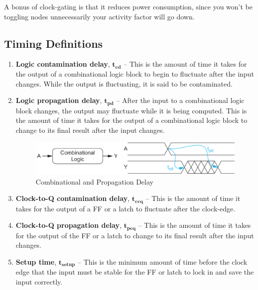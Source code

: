 \documentclass{article}
\begin{document}
A bonus of clock-gating is that it reduces power consumption, since you won't be toggling nodes unnecessarily your activity factor will go down.

\subsection{Timing Definitions}

\begin{enumerate}

\item \textbf{Logic contamination delay}, $\mathbf{t_{cd}}$ -- This is the amount of time it takes for the output of a combinational logic block to begin to fluctuate after the input changes. While the output is fluctuating, it is said to be contaminated.

\item \textbf{Logic propagation delay}, $\mathbf{t_{pd}}$ -- After the input to a combinational logic block changes, the output may fluctuate while it is being computed. This is the amount of time it takes for the output of a combinational logic block to change to its final result after the input changes. 

\begin{figure}[ht!]
\centering
\includegraphics[width=110mm]{Prop.png}
\caption{Combinational and Propagation Delay}
\end{figure}

\item \textbf{Clock-to-Q contamination delay}, $\mathbf{t_{ccq}}$ -- This is the amount of time it takes for the output of a FF or a latch to fluctuate after the clock-edge. 

\item \textbf{Clock-to-Q propagation delay}, $\mathbf{t_{pcq}}$ -- This is the amount of time it takes for the output of the FF or a latch to change to its final result after the input changes. 

\item \textbf{Setup time}, $\mathbf{t_{setup}}$ -- This is the minimum amount of time before the clock edge that the input must be stable for the FF or latch to lock in and save the input correctly.


\end{enumerate}
\end{document}
